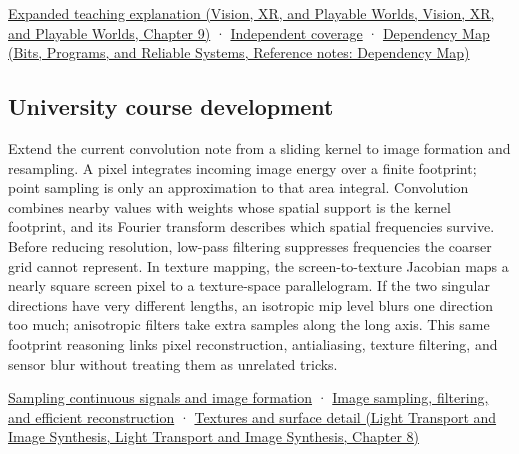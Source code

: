 \href{../07-Vision-XR-and-Playable-Worlds/main.pdf\#nameddest=04-visual-computing-ii-ch042-a-footprint-is-more-meaningful-than-an-isolated-pixel-center}{Expanded teaching explanation (Vision, XR, and Playable Worlds, Vision, XR, and Playable Worlds, Chapter 9)} · \hyperref[appendix-fd090d982a15-xr01---independent-seeing-and-representation-source]{Independent coverage} · \href{../01-Bits-Programs-and-Reliable-Systems/main.pdf\#nameddest=appendix-4ad47bdd269a}{Dependency Map (Bits, Programs, and Reliable Systems, Reference notes: Dependency Map)}

\subsection{University course development}\label{appendix-d5b3c692d9f0-university-course-development}

Extend the current convolution note from a sliding kernel to image formation and resampling. A pixel integrates incoming image energy over a finite footprint; point sampling is only an approximation to that area integral. Convolution combines nearby values with weights whose spatial support is the kernel footprint, and its Fourier transform describes which spatial frequencies survive. Before reducing resolution, low-pass filtering suppresses frequencies the coarser grid cannot represent. In texture mapping, the screen-to-texture Jacobian maps a nearly square screen pixel to a texture-space parallelogram. If the two singular directions have very different lengths, an isotropic mip level blurs one direction too much; anisotropic filters take extra samples along the long axis. This same footprint reasoning links pixel reconstruction, antialiasing, texture filtering, and sensor blur without treating them as unrelated tricks.

\hyperref[03-visual-computing-i-ch003-sampling-continuous-signals-and-image-formation]{Sampling continuous signals and image formation} · \hyperref[03-visual-computing-i-ch004-image-sampling-filtering-and-efficient-reconstruction]{Image sampling, filtering, and efficient reconstruction} · \href{../04-Light-Transport-and-Image-Synthesis/main.pdf\#nameddest=03-visual-computing-i-ch019-textures-and-surface-detail}{Textures and surface detail (Light Transport and Image Synthesis, Light Transport and Image Synthesis, Chapter 8)}
